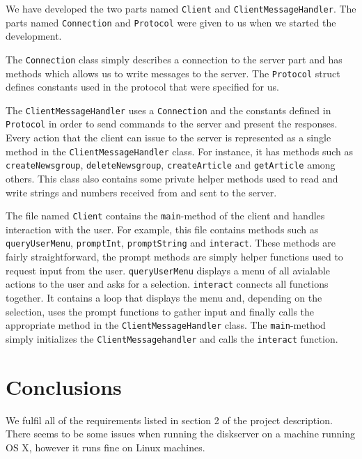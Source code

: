 \documentclass[a4paper]{article}
\begin{document}
We have developed the two parts named \texttt{Client} and \texttt{ClientMessageHandler}. The parts named \texttt{Connection} and \texttt{Protocol} were given to us when we started the development.

The \texttt{Connection} class simply describes a connection to the server part and has methods which allows us to write messages to the server. The \texttt{Protocol} struct defines constants used in the protocol that were specified for us.

The \texttt{ClientMessageHandler} uses a \texttt{Connection} and the constants defined in \texttt{Protocol} in order to send commands to the server and present the responses. Every action that the client can issue to the server is represented as a single method in the \texttt{ClientMessageHandler} class. For instance, it has methods such as \texttt{createNewsgroup}, \texttt{deleteNewsgroup}, \texttt{createArticle} and \texttt{getArticle} among others. This class also contains some private helper methods used to read and write strings and numbers received from and sent to the server.

The file named \texttt{Client} contains the \texttt{main}-method of the client and handles interaction with the user. For example, this file contains methods such as \texttt{queryUserMenu}, \texttt{promptInt}, \texttt{promptString} and \texttt{interact}. These methods are fairly straightforward, the prompt methods are simply helper functions used to request input from the user. \texttt{queryUserMenu} displays a menu of all avialable actions to the user and asks for a selection. \texttt{interact} connects all functions together. It contains a loop that displays the menu and, depending on the selection, uses the prompt functions to gather input and finally calls the appropriate method in the \texttt{ClientMessageHandler} class. The \texttt{main}-method simply initializes the \texttt{ClientMessagehandler} and calls the \texttt{interact} function.

\section{Conclusions}
We fulfil all of the requirements listed in section 2 of the project description.
There seems to be some issues when running the diskserver on a machine running OS X, however it runs fine on Linux machines.
\end{document}
